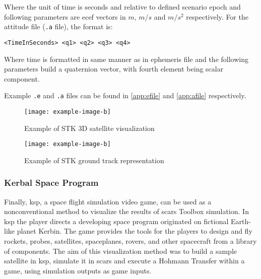         Where the unit of time is seconds and relative to defined scenario epoch and following parameters are \ac{ecef} vectors in $m$, $m/s$ and $m/s^2$ respectively. For the attitude file (\verb|.a| file), the format is:
        
        \begin{Verbatim}[fontsize=\small]
<TimeInSeconds> <q1> <q2> <q3> <q4>
        \end{Verbatim}
        
        Where time is formatted in same manner as in ephemeris file and the following parameters build a quaternion vector, with fourth element being scalar component.

        Example \verb|.e| and \verb|.a| files can be found in \autoref{app:efile} and \autoref{app:afile} respectively.


        \begin{figure}[H]
            \centering
            \texttt{[image: example-image-b]}
            \caption{Example of STK 3D satellite visualization}
            \label{fig:stk-3d}
        \end{figure}

        \begin{figure}[H]
            \centering
            \texttt{[image: example-image-b]}
            \caption{Example of STK ground track representation}
            \label{fig:stk-ground}
        \end{figure}


    \subsubsection{Kerbal Space Program}\label{sec:ksp}
        Finally, \ac{ksp}, a space flight simulation video game, can be used as a nonconventional method to visualize the results of \ac{scars} Toolbox simulation. In \ac{ksp} the player directs a developing space program originated on fictional Earth-like planet Kerbin. The game provides the tools for the players to design and fly rockets, probes, satellites, spaceplanes, rovers, and other spacecraft from a library of components.\cite{kerbals} The aim of this visualization method was to build a sample satellite in \ac{ksp}, simulate it in \ac{scars} and execute a Hohmann Transfer within a game, using simulation outputs as game inputs.

